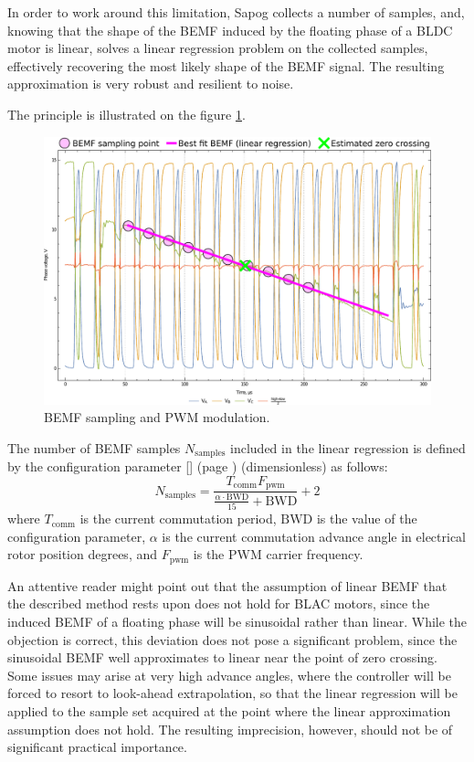 \documentclass{zubaxdoc}
\newcommand{\CfgRef}[1]{
    \StrSubstitute{#1}{+}{\textunderscore}[\temp]
    \texttt{\temp} {\footnotesize (page \pageref{#1})}
}
\begin{document}
In order to work around this limitation, Sapog collects a number of samples, and,
knowing that the shape of the BEMF induced by the floating phase of a BLDC motor is linear,
solves a linear regression problem on the collected samples, effectively recovering the most likely
shape of the BEMF signal.
The resulting approximation is very robust and resilient to noise.

The principle is illustrated on the figure \ref{phase_voltage_sampling}.

\begin{figure}[hbtp]
    \centering
	\includegraphics[width=\textwidth]{phase_voltage_sampling}
	\caption{BEMF sampling and PWM modulation.
	\label{phase_voltage_sampling}}
\end{figure}

The number of BEMF samples $N_\text{samples}$ included in the linear regression is defined by
the configuration parameter \CfgRef{mot+bemf+win+den} (dimensionless) as follows:
\begin{equation}
N_\text{samples} =
\frac{T_{\text{comm}} F_{\text{pwm}}}{\frac{\alpha\cdot\text{BWD}}{15} + \text{BWD}} + 2
\end{equation}
where $T_{\text{comm}}$ is the current commutation period,
$\text{BWD}$ is the value of the configuration parameter,
$\alpha$ is the current commutation advance angle in electrical rotor position degrees,
and $F_{\text{pwm}}$ is the PWM carrier frequency.

An attentive reader might point out that the assumption of linear BEMF that the described method rests
upon does not hold for BLAC motors, since the induced BEMF of a floating phase will be sinusoidal rather
than linear.
While the objection is correct, this deviation does not pose a significant problem, since the sinusoidal
BEMF well approximates to linear near the point of zero crossing.
Some issues may arise at very high advance angles, where the controller will be forced to resort to
look-ahead extrapolation, so that the linear regression will be applied to the sample set acquired
at the point where the linear approximation assumption does not hold.
The resulting imprecision, however, should not be of significant practical importance.
\end{document}
